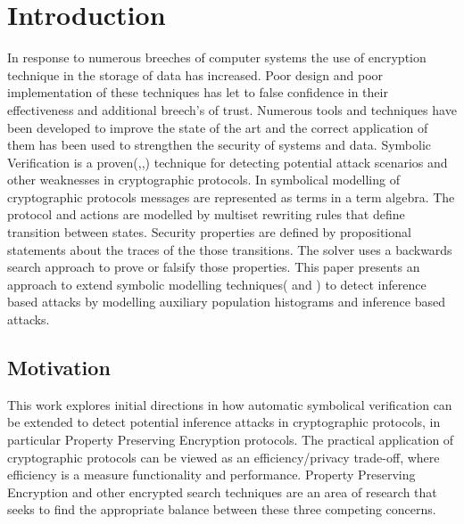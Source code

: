 \documentclass[journal]{IEEEtran}
\begin{document}


\section{Introduction}
In response to numerous breeches of computer systems the use of encryption technique in the storage of data has increased. Poor design and poor implementation of these techniques has let to false confidence in their effectiveness and additional breech's of trust.
Numerous tools and techniques have been developed to improve the state of the  art and the correct application of them has been used to strengthen the security of systems and data\cite{SOK2017}.  
Symbolic Verification is a proven(\cite{Meier2013},\cite{5GAKA},\cite{18XOR}) technique for detecting potential attack scenarios and other weaknesses in cryptographic protocols.
In symbolical modelling of cryptographic protocols messages are represented as terms in a term algebra. The protocol and actions are modelled by multiset rewriting rules that define transition between states. Security properties are defined by propositional statements about the traces of the those transitions. The solver uses a backwards search approach to prove or falsify those properties. This paper presents an approach to extend symbolic modelling techniques(\cite{Meier2013} and \cite{ObsEqvCCS15}) to detect inference based attacks by modelling auxiliary population histograms and inference based attacks.
\subsection{Motivation }
This work explores initial directions in how automatic symbolical verification can be extended to detect potential inference attacks in cryptographic protocols, in particular Property Preserving Encryption protocols. The practical application of cryptographic protocols can be viewed as an efficiency/privacy trade-off\cite{GenericAttacks}, where efficiency is a measure functionality and performance. Property Preserving Encryption and other encrypted search techniques\cite{SOK2017} are an area of research that seeks to find the appropriate balance between these three competing concerns. 
\end{document}
